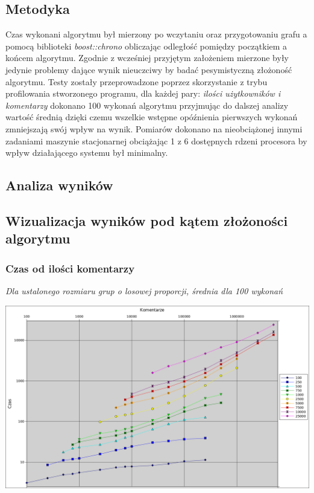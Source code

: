 \documentclass[11pt]{article}
\newcommand{\+}{\discretionary{\mbox{\scriptsize$\hookleftarrow$}}{}{}}
\begin{document}
\subsection{Metodyka}
Czas wykonani algorytmu był mierzony po wczytaniu oraz przygotowaniu grafu a pomocą biblioteki \textsl{boost::chrono} obliczając odległość pomiędzy początkiem a końcem algorytmu. Zgodnie z wcześniej przyjętym założeniem mierzone były jedynie problemy dające wynik nieuczciwy by badać pesymistyczną złożoność algorytmu. Testy zostały przeprowadzone poprzez skorzystanie z trybu profilowania stworzonego programu, dla każdej pary: \textsl{ilości użytkowników i komentarzy} dokonano 100 wykonań algorytmu przyjmując do dalszej analizy wartość średnią dzięki czemu wszelkie wstępne opóźnienia pierwszych wykonań zmniejszają swój wpływ na wynik. Pomiarów dokonano na nieobciążonej innymi zadaniami maszynie stacjonarnej obciążając 1 z 6 dostępnych rdzeni procesora by wpływ działającego systemu był minimalny.
\subsection{Analiza wyników}
  \clearpage
\subsection{Wizualizacja wyników pod kątem złożoności algorytmu}
  \subsubsection{Czas od ilości komentarzy}
  \textsl{Dla ustalonego rozmiaru grup o losowej proporcji, średnia dla 100 wykonań}\\
  \begin{centering}
  	\includegraphics[width=\textwidth]{Wykres1}
  \end{centering}
  
\end{document}
